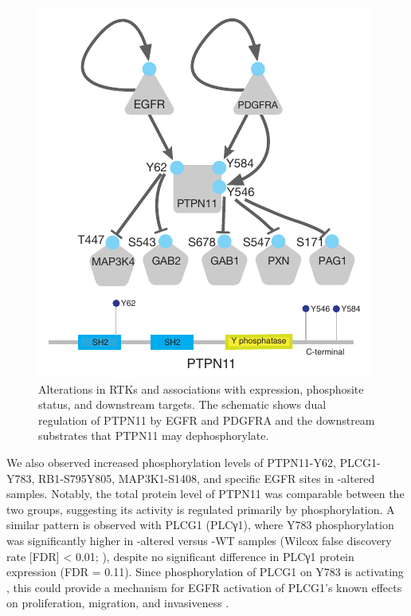 \begin{figure}[tb]
    \centering
    \includegraphics[width=0.5\linewidth]{figures/chap04_cptac_gbm_discov/figure3_ptpn11.pdf}
    \caption[Alterations in RTKs and associations with expression, phosphosite status, and downstream targets.]{%
        Alterations in RTKs and associations with expression, phosphosite status, and downstream targets. The schematic shows dual regulation of PTPN11 by EGFR and PDGFRA and the downstream substrates that PTPN11 may dephosphorylate.
    }
    \label{fig:gbm-ptpn11}
\end{figure}

We also observed increased phosphorylation levels of PTPN11-Y62, PLCG1-Y783, RB1-S795Y805, MAP3K1-S1408, and specific EGFR sites in -altered samples. Notably, the total protein level of PTPN11 was comparable between the two groups, suggesting its activity is regulated primarily by phosphorylation. A similar pattern is observed with PLCG1 (PLCγ1), where Y783 phosphorylation was significantly higher in -altered versus -WT samples (Wilcox false discovery rate [FDR] < 0.01; ), despite no significant difference in PLCγ1 protein expression (FDR = 0.11). Since phosphorylation of PLCG1 on Y783 is activating \cite{poulinb_rheesg:IntramolecularInteraction2005}, this could provide a mechanism for EGFR activation of PLCG1’s known effects on proliferation, migration, and invasiveness \cite{kunzek_brauningera:RecurrentActivating2014}.

